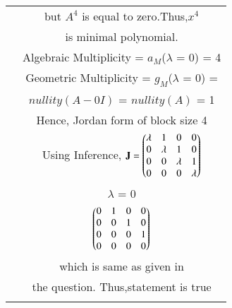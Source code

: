 \begin{table*}[ht!]
\begin{center}
\begin{tabular}{|c|c|}
& but $A^4$ is equal to zero.Thus,$x^4$\\
& is minimal polynomial.\\
& Algebraic Multiplicity = $a_M$($\lambda$ = 0) = 4\\
& Geometric Multiplicity = $g_M$($\lambda$ = 0) = \\
& $nullity(A-0I)$ = $nullity(A)$ = 1\\
& Hence, Jordan form of block size 4\\
& Using Inference, $\mathbf{J} = \begin{pmatrix}\lambda & 1 & 0 & 0 \\ 
                        0 & \lambda & 1 & 0\\ 
                        0 & 0 & \lambda & 1\\
                        0 & 0 & 0 & \lambda \end{pmatrix}$ \\
& $\lambda$ = 0 \\ 
& $\begin{pmatrix}0&1&0&0\\
       0&0&1&0\\
       0&0&0&1\\
       0&0&0&0\end{pmatrix}$\\
& which is same as given in\\
& the question. Thus,statement is true \\
& \\
\hline
\end{tabular}
\end{center}
\caption{}
\label{eq:solutions/2017/dec/76/table1}
\end{table*}
